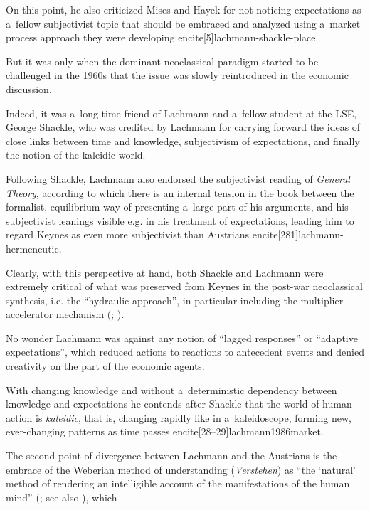 {On this point, he also criticized Mises and Hayek for not noticing expectations as a~fellow subjectivist topic that should be embraced and analyzed using a~market process approach they were developing encite[5]{lachmann-shackle-place}.

But it was only when the dominant neoclassical paradigm started to be challenged in the 1960s that the issue was slowly reintroduced in the economic discussion.



Indeed, it was a~long-time friend of Lachmann and a~fellow student at the LSE, George Shackle, who was credited by Lachmann for carrying forward the ideas of close links between time and knowledge, subjectivism of expectations, and finally the notion of the kaleidic world.

Following Shackle, Lachmann also endorsed the subjectivist reading of \emph{General Theory}, according to which there is an internal tension in the book between the formalist, equilibrium way of presenting a~large part of his arguments, and his subjectivist leanings visible e.g. in his treatment of expectations, leading him to regard Keynes as even more subjectivist than Austrians encite[281]{lachmann-hermeneutic}.

Clearly, with this perspective at hand, both Shackle and Lachmann were extremely critical of what was preserved from Keynes in the post-war neoclassical synthesis, i.e. the ``hydraulic approach'', in particular including the multiplier-accelerator mechanism (\cite[188]{lachmann-keynes}; \citeyear[149]{lachmann-hayek-sraffa}).



No wonder Lachmann was against any notion of ``lagged responses'' or ``adaptive expectations'', which reduced actions to reactions to antecedent events and denied creativity on the part of the economic agents.

With changing knowledge and without a~deterministic dependency between knowledge and expectations he contends after Shackle that the world of human action is \emph{kaleidic}, that is, changing rapidly like in a~kaleidoscope, forming new, ever-changing patterns as time passes encite[28--29]{lachmann1986market}.



The second point of divergence between Lachmann and the Austrians is the embrace of the Weberian method of understanding (\emph{Verstehen}) as ``the `natural' method of rendering an intelligible account of the manifestations of the human mind'' (\cite[17--18]{lachmann-weber}; see also \cite[47]{lachmann-significance}), which

}
